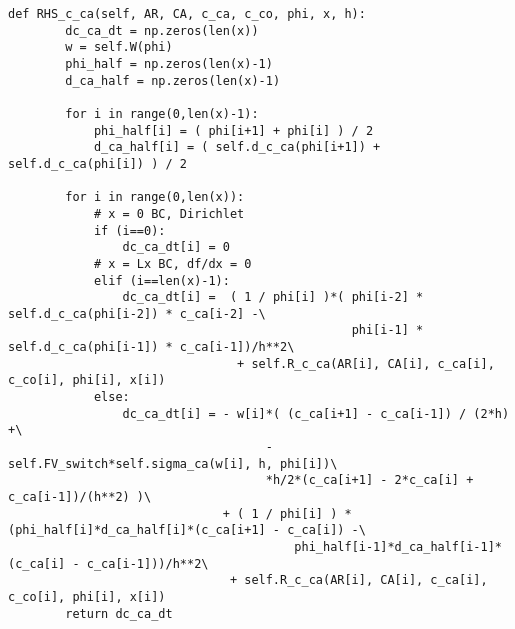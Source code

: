 \documentclass[a4paper]{article}
\begin{document}
\begin{lstlisting}
def RHS_c_ca(self, AR, CA, c_ca, c_co, phi, x, h):
        dc_ca_dt = np.zeros(len(x))
        w = self.W(phi)
        phi_half = np.zeros(len(x)-1)
        d_ca_half = np.zeros(len(x)-1)
        
        for i in range(0,len(x)-1):
            phi_half[i] = ( phi[i+1] + phi[i] ) / 2
            d_ca_half[i] = ( self.d_c_ca(phi[i+1]) + self.d_c_ca(phi[i]) ) / 2
        
        for i in range(0,len(x)):
            # x = 0 BC, Dirichlet
            if (i==0):
                dc_ca_dt[i] = 0
            # x = Lx BC, df/dx = 0
            elif (i==len(x)-1):
                dc_ca_dt[i] =  ( 1 / phi[i] )*( phi[i-2] * self.d_c_ca(phi[i-2]) * c_ca[i-2] -\
                                                phi[i-1] * self.d_c_ca(phi[i-1]) * c_ca[i-1])/h**2\  
                                + self.R_c_ca(AR[i], CA[i], c_ca[i], c_co[i], phi[i], x[i]) 
            else:
                dc_ca_dt[i] = - w[i]*( (c_ca[i+1] - c_ca[i-1]) / (2*h) +\
                                    -self.FV_switch*self.sigma_ca(w[i], h, phi[i])\
                                    *h/2*(c_ca[i+1] - 2*c_ca[i] + c_ca[i-1])/(h**2) )\
                              + ( 1 / phi[i] ) * (phi_half[i]*d_ca_half[i]*(c_ca[i+1] - c_ca[i]) -\
                                        phi_half[i-1]*d_ca_half[i-1]*(c_ca[i] - c_ca[i-1]))/h**2\
                               + self.R_c_ca(AR[i], CA[i], c_ca[i], c_co[i], phi[i], x[i])
        return dc_ca_dt
\end{lstlisting}

\end{document}

